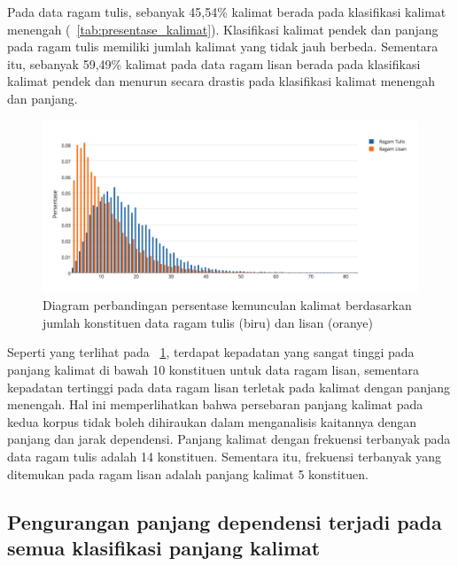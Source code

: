 Pada data ragam tulis, sebanyak 45,54\% kalimat berada pada klasifikasi kalimat menengah (\tab~\ref{tab:presentase_kalimat}). Klasifikasi kalimat pendek dan panjang pada ragam tulis memiliki jumlah kalimat yang tidak jauh berbeda. Sementara itu, sebanyak 59,49\% kalimat pada data ragam lisan berada pada klasifikasi kalimat pendek dan menurun secara drastis pada klasifikasi kalimat menengah dan panjang.  

\begin{figure}
	\centering \includegraphics[width=1
	\textwidth] {pics/Jumlah_kata.png} 
	\caption{Diagram perbandingan persentase kemunculan kalimat berdasarkan jumlah konstituen data ragam tulis (biru) dan lisan (oranye)} 
	\label{fig:jumlah_kata} 
\end{figure}

Seperti yang terlihat pada \pic~\ref{fig:jumlah_kata}, terdapat kepadatan yang sangat tinggi pada panjang kalimat di bawah 10 konstituen untuk data ragam lisan, sementara kepadatan tertinggi pada data ragam lisan terletak pada kalimat dengan panjang menengah. Hal ini memperlihatkan bahwa persebaran panjang kalimat pada kedua korpus tidak boleh dihiraukan dalam menganalisis kaitannya dengan panjang dan jarak dependensi. Panjang kalimat dengan frekuensi terbanyak pada data ragam tulis adalah 14 konstituen. Sementara itu, frekuensi terbanyak yang ditemukan pada ragam lisan adalah panjang kalimat 5 konstituen.

\subsection{Pengurangan panjang dependensi terjadi pada semua klasifikasi panjang kalimat}

